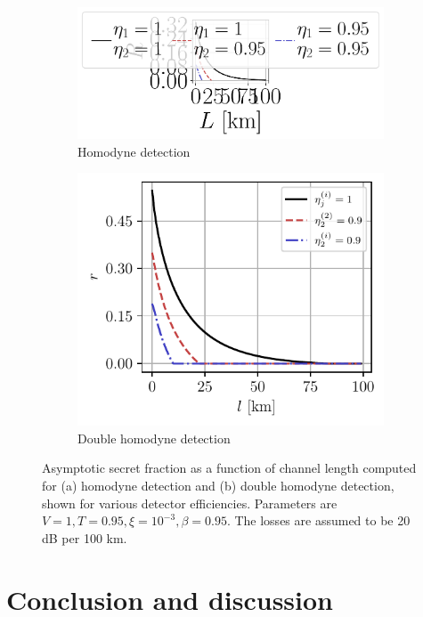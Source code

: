 \documentclass[%
reprint,
superscriptaddress,
 amsmath,amssymb,amsfonts,
 aps,
 pra,
 longbibliography
]{revtex4-2}
\begin{document}
\begin{figure}
    \centering
    \begin{subfigure}[]{.45\textwidth}
\includegraphics[width=\linewidth]{pics/qkd/hom/r(l).pdf}
\caption[]{Homodyne detection}
\label{fig:hom-r}
        \end{subfigure}
        \begin{subfigure}[]{.45\textwidth}
 \includegraphics[width=\linewidth]{pics/qkd/dhom/r(l).pdf}
\caption[]{Double homodyne detection}
\label{fig:dhom-r}
\end{subfigure}
\caption{Asymptotic secret fraction as a function of channel length computed for (a) homodyne detection and (b) double homodyne detection, shown for various detector efficiencies. Parameters are $V=1,T=0.95,\xi=10^{-3}, \beta=0.95$. The losses are assumed to be 20 dB per 100 km.
}
\label{fig:r-of-l-all}
\end{figure}
\section{Conclusion and discussion}
\label{sec:conclusion}
\end{document}
